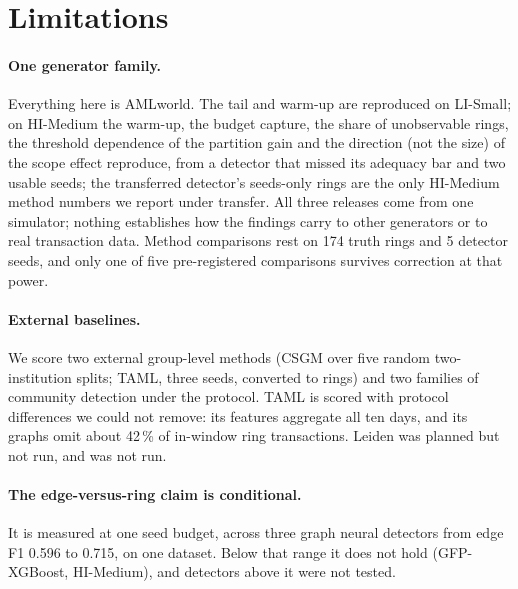 \section{Limitations}
\label{sec:limitations}

\paragraph{One generator family.}
Everything here is AMLworld. The tail and warm-up are reproduced on LI-Small; on HI-Medium the
warm-up, the budget capture, the share of unobservable rings, the threshold dependence of the
partition gain and the direction (not the size) of the scope effect reproduce, from a detector
that missed its adequacy bar and two usable seeds; the transferred detector's seeds-only rings
are the only HI-Medium method numbers we report under transfer. All three releases come from one simulator;
nothing establishes how the findings carry to other generators or to real transaction data. Method
comparisons rest on 174 truth rings and 5 detector seeds, and only one of five pre-registered
comparisons survives correction at that power.

\paragraph{External baselines.}
We score two external group-level methods (CSGM over five random two-institution splits; TAML,
three seeds, converted to rings) and two families of community detection under the protocol.
TAML is scored with protocol differences we could not remove: its features aggregate all ten
days, and its graphs omit about 42\,\% of in-window ring transactions. Leiden was planned but not
run, and \citet{chai2023} was not run.

\paragraph{The edge-versus-ring claim is conditional.}
It is measured at one seed budget, across three graph neural detectors from edge F1 0.596 to
0.715, on one dataset. Below that range it does not hold (GFP-XGBoost, HI-Medium), and detectors
above it were not tested.

